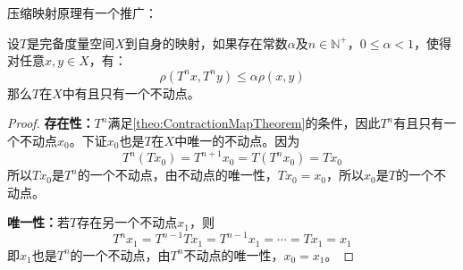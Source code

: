 压缩映射原理有一个推广：
\begin{theorem}
	设$T$是完备度量空间$X$到自身的映射，如果存在常数$\alpha$及$n\in\mathbb{N}^+$，$0\leqslant\alpha<1$，使得对任意$x,y\in X$，有：
	\begin{equation*}
		\rho(T^{n}x,T^{n}y)\leqslant\alpha\rho(x,y)
	\end{equation*}
	那么$T$在$X$中有且只有一个不动点。
\end{theorem}
\begin{proof}
	\textbf{存在性：}$T^{n}$满足\cref{theo:ContractionMapTheorem}的条件，因此$T^{n}$有且只有一个不动点$x_0$。下证$x_0$也是$T$在$X$中唯一的不动点。因为
	\begin{equation*}
		T^{n}(Tx_0)=T^{n+1}x_0=T(T^{n}x_0)=Tx_0
	\end{equation*}
	所以$Tx_0$是$T^{n}$的一个不动点，由不动点的唯一性，$Tx_0=x_0$，所以$x_0$是$T$的一个不动点。\par
	\textbf{唯一性：}若$T$存在另一个不动点$x_1$，则
	\begin{equation*}
		T^{n}x_1=T^{n-1}Tx_1=T^{n-1}x_1=\cdots=Tx_1=x_1
	\end{equation*}
	即$x_1$也是$T^{n}$的一个不动点，由$T^{n}$不动点的唯一性，$x_0=x_1$。
\end{proof}


